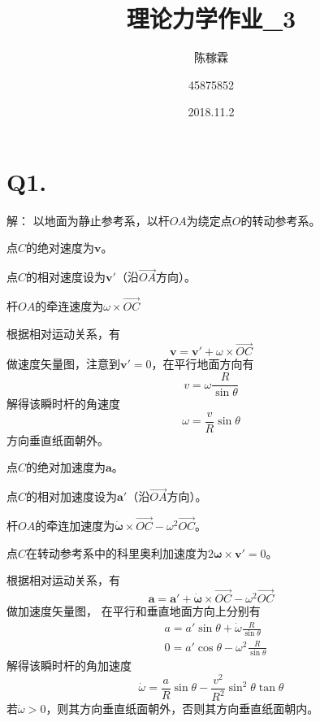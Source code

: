 \documentclass[10pt,a4paper]{article}
\title{理论力学作业\_3}
\author{陈稼霖 \and 45875852}
\date{2018.11.2}
\begin{document}
\maketitle
\section*{Q1.}解：
以地面为静止参考系，以杆$OA$为绕定点$O$的转动参考系。

\noindent 点$C$的绝对速度为$\bm{v}$。

\noindent 点$C$的相对速度设为$\bm{v}'$（沿$\overrightarrow{OA}$方向）。

\noindent 杆$OA$的牵连速度为$\omega\times\overrightarrow{OC}$

\noindent 根据相对运动关系，有
\[
\bm{v} = \bm{v}' + \omega\times\overrightarrow{OC}
\]
做速度矢量图，注意到$\bm{v}' = 0$，在平行地面方向有
\[
v = \omega\frac{R}{\sin\theta}
\]
解得该瞬时杆的角速度
\[
\omega = \frac{v}{R}\sin\theta
\]
方向垂直纸面朝外。

\noindent 点$C$的绝对加速度为$\bm{a}$。

\noindent 点$C$的相对加速度设为$\bm{a}'$（沿$\overrightarrow{OA}$方向）。

\noindent 杆$OA$的牵连加速度为$\dot{\bm{\omega}}\times\overrightarrow{OC} - \omega^2\overrightarrow{OC}$。

\noindent 点$C$在转动参考系中的科里奥利加速度为$2\bm{\omega}\times\bm{v}' = 0$。

\noindent 根据相对运动关系，有
\[
\bm{a} = \bm{a}' + \dot{\bm{\omega}}\times\overrightarrow{OC} - \omega^2\overrightarrow{OC}
\]
做加速度矢量图，
在平行和垂直地面方向上分别有
\begin{align*}
&a = a'\sin\theta + \dot{\omega}\frac{R}{\sin\theta}\\
&0 = a'\cos\theta - \omega^2\frac{R}{\sin\theta}
\end{align*}
解得该瞬时杆的角加速度
\[
\dot{\omega} = \frac{a}{R}\sin\theta - \frac{v^2}{R^2}\sin^2\theta\tan\theta
\]
若$\dot{\omega} > 0$，则其方向垂直纸面朝外，否则其方向垂直纸面朝内。
\end{document}

